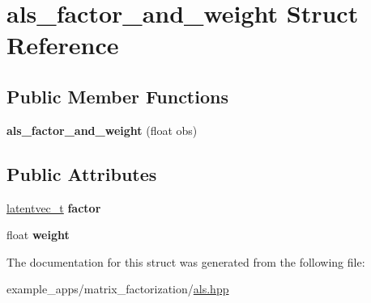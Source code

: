 \hypertarget{structals__factor__and__weight}{\section{als\-\_\-factor\-\_\-and\-\_\-weight Struct Reference}
\label{structals__factor__and__weight}
}
\subsection*{Public Member Functions}
\begin{DoxyCompactItemize}
\item 
\hypertarget{structals__factor__and__weight_af6bf4e82eb547040e2496bab0659e1bc}{{\bfseries als\-\_\-factor\-\_\-and\-\_\-weight} (float obs)}\label{structals__factor__and__weight_af6bf4e82eb547040e2496bab0659e1bc}

\end{DoxyCompactItemize}
\subsection*{Public Attributes}
\begin{DoxyCompactItemize}
\item 
\hypertarget{structals__factor__and__weight_a7e389415210f67a5bb7540a1ab7d469c}{\hyperlink{structlatentvec__t}{latentvec\-\_\-t} {\bfseries factor}}\label{structals__factor__and__weight_a7e389415210f67a5bb7540a1ab7d469c}

\item 
\hypertarget{structals__factor__and__weight_a123c4467e334d6840771f0e2f2bb9473}{float {\bfseries weight}}\label{structals__factor__and__weight_a123c4467e334d6840771f0e2f2bb9473}

\end{DoxyCompactItemize}


The documentation for this struct was generated from the following file\-:\begin{DoxyCompactItemize}
\item 
example\-\_\-apps/matrix\-\_\-factorization/\hyperlink{als_8hpp}{als.\-hpp}\end{DoxyCompactItemize}
